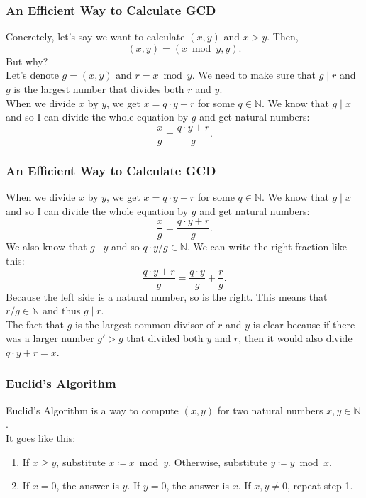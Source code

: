 \documentclass[aspectratio=169,11pt,usenames,dvipsnames,handout]{beamer}
\newcommand{\N}{\mathbb{N}}
\begin{document}
\begin{frame}
 \frametitle{An Eff\hspace*{0pt}icient Way to Calculate GCD}
 Concretely, let's say we want to calculate $(x,y)$ and $x > y$. Then,
 \[
  (x,y) = (x \bmod y, y).
 \]
 But why?\\
 \pause
 Let's denote $g = (x,y)$ and $r = x \bmod y$. We need to make sure that $g \mid
 r$ and $g$ is the largest number that divides both $r$ and $y$.\\
 \pause
 When we divide $x$ by $y$, we get $x = q \cdot y + r$ for some $q \in \N$. We
 know that $g \mid x$ and so I can divide the whole equation by $g$ and get
 natural numbers:
 \[
  \frac{x}{g} = \frac{q \cdot y + r}{g}.
 \]
\end{frame}

\begin{frame}
 \frametitle{An Eff\hspace*{0pt}icient Way to Calculate GCD}
 When we divide $x$ by $y$, we get $x = q \cdot y + r$ for some $q \in \N$. We
 know that $g \mid x$ and so I can divide the whole equation by $g$ and get
 natural numbers:
 \[
  \frac{x}{g} = \frac{q \cdot y + r}{g}.
 \]
 We also know that $g \mid y$ and so $q \cdot y / g \in \N$. We can write the
 right fraction like this:
 \[
  \frac{q \cdot y + r}{g} = \frac{q \cdot y}{g} + \frac{r}{g}.
 \]
 Because the left side is a natural number, so is the right. This means that $r
 / g \in \N$ and thus $g \mid r$.\\
 \pause
 The fact that $g$ is the \alert{largest} common divisor of $r$ and $y$ is clear
 because if there was a larger number $g'>g$ that divided both $y$ and $r$, then
 it would also divide $q \cdot y + r = x$.
\end{frame}

\begin{frame}
 \frametitle{Euclid's Algorithm}
 \alert{Euclid's Algorithm} is a way to compute $(x,y)$ for two natural numbers
 $x,y \in \N$.\\
 \pause
 It goes like this:
 \begin{enumerate}
  \item If $x \geq y$, substitute $x \coloneqq x \bmod y$. Otherwise, substitute
   $y \coloneqq y \bmod x$.
  \pause 
  \item If $x = 0$, the answer is $y$. If $y = 0$, the answer is $x$. If $x,y
   \neq 0$, repeat step 1.
 \end{enumerate}
\end{frame}
\end{document}
